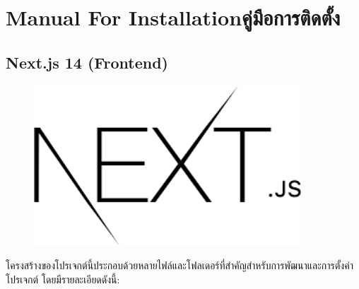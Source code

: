 


\chapter{\ifenglish Manual For Installation\else คู่มือการติดตั้ง\fi}

\section{Next.js 14 (Frontend)}
\begin{figure}[H]
    \centering
    \includegraphics[width=100mm, keepaspectratio ]{pictures/nextjs.png}
\end{figure}
โครงสร้างของโปรเจกต์นี้ประกอบด้วยหลายไฟล์และโฟลเดอร์ที่สำคัญสำหรับการพัฒนาและการตั้งค่าโปรเจกต์ โดยมีรายละเอียดดังนี้:

